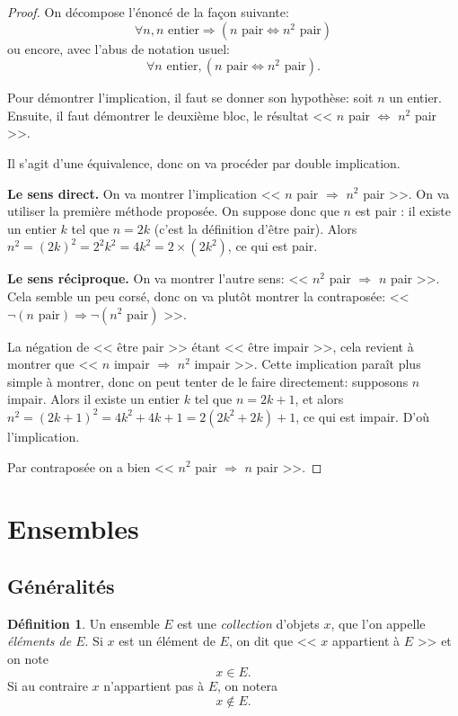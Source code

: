 \documentclass[11pt]{article}
\theoremstyle{definition}
\newtheorem{defn}{Définition}[section]
\theoremstyle{remark}
\begin{document}
\begin{proof}
	On décompose l'énoncé de la façon suivante:
	\[ \forall n,n\text{ entier}\Rightarrow (n\text{ pair}\Leftrightarrow n^2\text{ pair}) \]
	ou encore, avec l'abus de notation usuel:
	\[ \forall n\text{ entier},(n\text{ pair}\Leftrightarrow n^2\text{ pair}). \]
	
	Pour démontrer l'implication, il faut se donner son hypothèse: soit $n$ un entier. Ensuite, il faut démontrer le deuxième bloc, le résultat << $n$ pair $\Leftrightarrow$ $n^2$ pair >>.
	
	Il s'agit d'une équivalence, donc on va procéder par double implication.
	
	\textbf{Le sens direct.} On va montrer l'implication << $n$ pair $\Rightarrow$ $n^2$ pair >>. On va utiliser la première méthode proposée. On suppose donc que $n$ est pair : il existe un entier $k$ tel que $n=2k$ (c'est la définition d'être pair). Alors $n^2=(2k)^2=2^2k^2=4k^2=2\times (2k^2)$, ce qui est pair.
	
	\textbf{Le sens réciproque.} On va montrer l'autre sens: << $n^2$ pair $\Rightarrow$ $n$ pair >>. Cela semble un peu corsé, donc on va plutôt montrer la contraposée: << $\neg(n\text{ pair})\Rightarrow \neg(n^2\text{ pair})$ >>.
	
	La négation de << être pair >> étant << être impair >>, cela revient à montrer que << $n$ impair $\Rightarrow$ $n^2$ impair >>. Cette implication paraît plus simple à montrer, donc on peut tenter de le faire directement: supposons $n$ impair. Alors il existe un entier $k$ tel que $n=2k+1$, et alors $n^2=(2k+1)^2=4k^2+4k + 1 = 2(2k^2+2k)+1$, ce qui est impair. D'où l'implication.
	
	Par contraposée on a bien << $n^2$ pair $\Rightarrow$ $n$ pair >>.
\end{proof}


\section{Ensembles}

\subsection{Généralités}

\begin{defn}
	Un ensemble $E$ est une \textit{collection} d'objets $x$, que l'on appelle \textit{éléments de $E$}. Si $x$ est un élément de $E$, on dit que << $x$ appartient à $E$ >> et on note \[x\in E.\]
Si au contraire $x$ n'appartient pas à $E$, on notera
    \[x\not\in E.\]
\end{defn}
\end{document}
